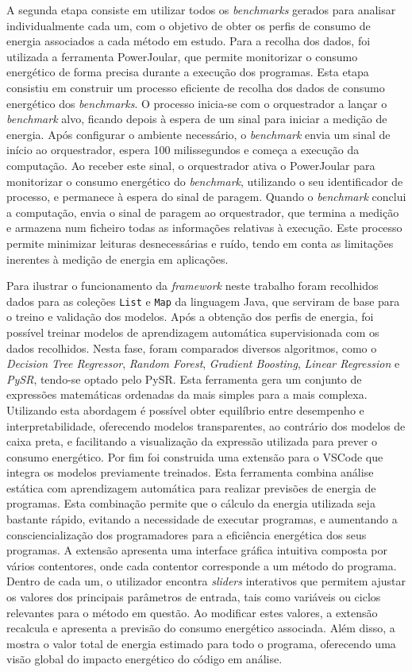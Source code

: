 A segunda etapa consiste em utilizar todos os \textit{benchmarks} gerados para analisar individualmente cada um, com o objetivo de obter os perfis de consumo de energia associados a cada método em estudo.
Para a recolha dos dados, foi utilizada a ferramenta PowerJoular, que permite monitorizar o consumo energético de forma precisa durante a execução dos programas.
Esta etapa consistiu em construir um processo eficiente de recolha dos dados de consumo energético dos \textit{benchmarks}. O processo inicia-se com o orquestrador a lançar o \textit{benchmark} alvo, ficando depois à espera de um sinal para iniciar a medição de energia. Após configurar o ambiente necessário, o \textit{benchmark} envia um sinal de início ao orquestrador, espera 100 milissegundos e começa a execução da computação. Ao receber este sinal, o orquestrador ativa o PowerJoular para monitorizar o consumo energético do \textit{benchmark}, utilizando o seu identificador de processo, e permanece à espera do sinal de paragem. Quando o \textit{benchmark} conclui a computação, envia o sinal de paragem ao orquestrador, que termina a medição e armazena num ficheiro todas as informações relativas à execução. Este processo permite minimizar leituras desnecessárias e ruído, tendo em conta as limitações inerentes à medição de energia em aplicações.


Para ilustrar o funcionamento da \textit{framework} neste trabalho foram recolhidos dados para as coleções \texttt{List} e \texttt{Map} da linguagem Java, que serviram de base para o treino e validação dos modelos.
Após a obtenção dos perfis de energia, foi possível treinar modelos de aprendizagem automática supervisionada com os dados recolhidos. Nesta fase, foram comparados diversos algoritmos, como o \textit{Decision Tree Regressor}, \textit{Random Forest}, \textit{Gradient Boosting}, \textit{Linear Regression} e \textit{PySR}, tendo-se optado pelo PySR. Esta ferramenta gera um conjunto de expressões matemáticas ordenadas da mais simples para a mais complexa. Utilizando esta abordagem é possível obter equilíbrio entre desempenho e interpretabilidade, oferecendo modelos transparentes, ao contrário dos modelos de caixa preta, e facilitando a visualização da expressão utilizada para prever o consumo energético.
Por fim foi construida uma extensão para o VSCode que integra os modelos previamente treinados. Esta ferramenta combina análise estática com aprendizagem automática para realizar previsões de energia de programas. Esta combinação permite que o cálculo da energia utilizada seja bastante rápido, evitando a necessidade de executar programas, e aumentando a consciencialização dos programadores para a eficiência energética dos seus programas. A extensão apresenta uma interface gráfica intuitiva composta por vários contentores, onde cada contentor corresponde a um método do programa. Dentro de cada um, o utilizador encontra \textit{sliders} interativos que permitem ajustar os valores dos principais parâmetros de entrada, tais como variáveis ou ciclos relevantes para o método em questão. Ao modificar estes valores, a extensão recalcula e apresenta a previsão do consumo energético associada. Além disso, a mostra o valor total de energia estimado para todo o programa, oferecendo uma visão global do impacto energético do código em análise.

